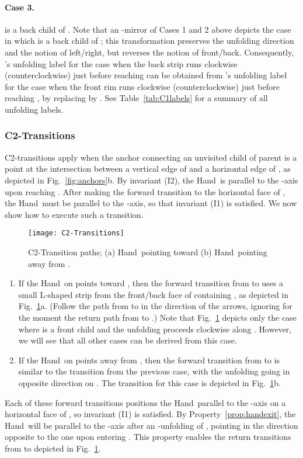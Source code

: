 \documentclass[11pt]{article}
\newcommand{\squeezelist}{\setlength{\itemsep}{0pt}}
\newcommand\hand{{\sc Hand}}
\begin{document}
\paragraph{Case 3.}  is a back child of . Note that an -mirror of Cases 1 and 2 above depicts the case in which  is a back child of ; this transformation preserves the unfolding direction and the notion of left/right, but reverses the notion of front/back. 
Consequently, 's unfolding label for the case when the back strip runs clockwise (counterclockwise) just before reaching  can be obtained from 's unfolding label for the case when the front rim runs clockwise (counterclockwise) just before reaching , by replacing  by . See Table~\ref{tab:C1labels} for a summary of all unfolding labels.

\subsubsection{C2-Transitions}
\label{sec:C2}
C2-transitions apply when the anchor connecting an unvisited child  of parent  is a point  at the intersection between a vertical edge of  and a horizontal edge of , as depicted in Fig.~\ref{fig:anchors}b.
By invariant (I2), the \hand\ is parallel to the -axis upon reaching . After making the forward transition to the horizontal face of , the \hand\ must be parallel to the -axis, so that invariant (I1) is satisfied. We now show how to execute such a transition.
\begin{figure}[hp]
\centering
\texttt{[image: C2-Transitions]}
\caption{C2-Transition paths; (a) \hand\ pointing toward  (b) \hand\ pointing away from .}
\label{fig:C2-transitions}
\end{figure}
\begin{enumerate}
\squeezelist
\item If the \hand\ on  points toward , then the forward transition from  to  uses a small L-shaped strip from the front/back face of  containing , as depicted in Fig.~\ref{fig:C2-transitions}a. (Follow the path from  to  in the direction of the arrows, ignoring for the moment the return path from  to .) Note that Fig.~\ref{fig:C2-transitions} depicts only the case where  is a front child and the unfolding proceeds clockwise along . However, we will see that all other cases can be derived from this case.
\item If the \hand\ on  points away from , then the forward transition from  to  is similar to the transition from the previous case, with the unfolding going in opposite direction on . The transition for this case is depicted in Fig.~\ref{fig:C2-transitions}b.
\end{enumerate}
Each of these forward transitions positions the \hand\ parallel to the -axis on a horizontal face of , so  invariant (I1) is satisfied. By Property~\ref{prop:handexit}, the \hand\ will be parallel to the -axis after an -unfolding of , pointing in the direction opposite to the one upon entering . This property enables the return transitions from  to  depicted in Fig.~\ref{fig:C2-transitions}.
\end{document}
